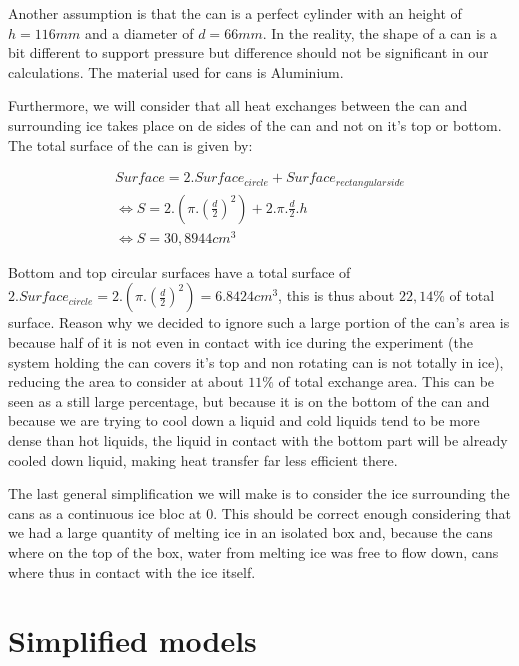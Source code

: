 \documentclass{report}
\begin{document}
	Another assumption is that the can is a perfect cylinder with an height of $h=116mm$ and a diameter of $d=66mm$. In the reality, the shape of a can is a bit different to support pressure but difference should not be significant in our calculations. The material used for cans is Aluminium.
	
	Furthermore, we will consider that all heat exchanges between the can and surrounding ice takes place on de sides of the can and not on it's top or bottom. The total surface of the can is given by:
	
	\begin{equation}
	\begin{gathered}
		Surface= 2.Surface_{circle} + Surface_{rectangular side} \\
		\Leftrightarrow S= 2. (\pi . (\frac{d}{2})^2) + 2.\pi . \frac{d}{2}.h \\
		\Leftrightarrow S= 30,8944 cm^3
	\end{gathered}
	\end{equation}
	
	Bottom and top circular surfaces have a total surface of $2.Surface_{circle}=2. (\pi . (\frac{d}{2})^2)= 6.8424 cm^3$, this is thus about $22,14\% $ of total surface. Reason why we decided to ignore such a large portion of the can's area is because half of it is not even in contact with ice during the experiment (the system holding the can covers it's top and non rotating can is not totally in ice), reducing the area to consider at about $11\% $ of total exchange area. This can be seen as a still large percentage, but because it is on the bottom of the can and because we are trying to cool down a liquid and cold liquids tend to be more dense than hot liquids, the liquid in contact with the bottom part will be already cooled down liquid, making heat transfer far less efficient there.
	
	The last general simplification we will make is to consider the ice surrounding the cans as a continuous ice bloc at 0\textcelsius. This should be correct enough considering that we had a large quantity of melting ice in an isolated box and, because the cans where on the top of the box, water from melting ice was free to flow down, cans where thus in contact with the ice itself.
	
	
	\section{Simplified models}\label{sm}
	
\end{document}
